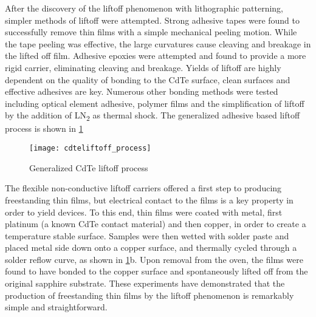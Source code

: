 After the discovery of the liftoff phenomenon with lithographic patterning, simpler methods of liftoff were attempted.
Strong adhesive tapes were found to successfully remove thin films with a simple mechanical peeling motion.
While the tape peeling was effective, the large curvatures cause cleaving and breakage in the lifted off film.
Adhesive epoxies were attempted and found to provide a more rigid carrier, eliminating cleaving and breakage.
Yields of liftoff are highly dependent on the quality of bonding to the CdTe surface, clean surfaces and effective adhesives are key.
Numerous other bonding methods were tested including optical element adhesive, polymer films and the simplification of liftoff by the addition of LN\textsubscript{2} as thermal shock.
The generalized adhesive based liftoff process is shown in \cref{fig:cdteliftoff_process}
\begin{figure}
 \centering \texttt{[image: cdteliftoff\_process]}
 \caption{\label{fig:cdteliftoff_process}Generalized CdTe liftoff process}
\end{figure}
The flexible non-conductive liftoff carriers offered a first step to producing freestanding thin films, but electrical contact to the films is a key property in order to yield devices.
To this end, thin films were coated with metal, first platinum (a known CdTe contact material) and then copper, in order to create a temperature stable surface.
Samples were then wetted with solder paste and placed metal side down onto a copper surface, and thermally cycled through a solder reflow curve, as shown in \cref{fig:cdteliftoff_process}b.
Upon removal from the oven, the films were found to have bonded to the copper surface and spontaneously lifted off from the original sapphire substrate.
These experiments have demonstrated that the production of freestanding thin films by the liftoff phenomenon is remarkably simple and straightforward.

